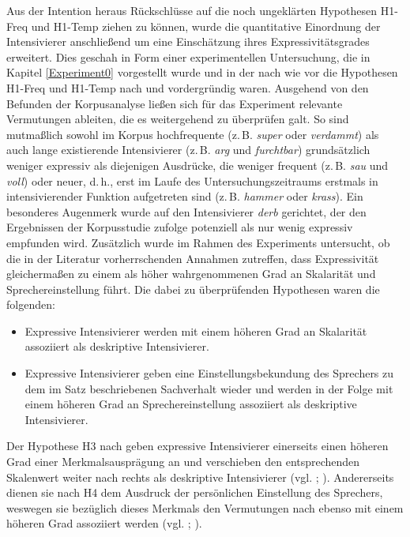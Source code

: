 Aus der Intention heraus Rückschlüsse auf die noch ungeklärten Hypothesen H1-Freq und H1-Temp ziehen zu können, wurde die quantitative Einordnung der Intensivierer anschließend um eine Einschätzung ihres Expressivitätsgrades erweitert. Dies geschah in Form einer experimentellen Untersuchung, die in Kapitel \ref{Experiment0} vorgestellt wurde und in der nach wie vor die Hypothesen H1-Freq und H1-Temp nach \citet[2]{Hauschild.1899} und \citet[59]{Tobler.1868} vordergründig waren. Ausgehend von den Befunden der Korpusanalyse ließen sich für das Experiment relevante Vermutungen ableiten, die es weitergehend zu überprüfen galt. So sind mutmaßlich sowohl im Korpus hochfrequente (z.\,B. \textit{super} oder \textit{verdammt}) als auch lange existierende Intensivierer (z.\,B. \textit{arg} und \textit{furchtbar}) grundsätzlich weniger expressiv als diejenigen Ausdrücke, die weniger frequent (z.\,B. \textit{sau} und \textit{voll}) oder neuer, d.\,h., erst im Laufe des Untersuchungszeitraums erstmals in intensivierender Funktion aufgetreten sind (z.\,B. \textit{hammer} oder \textit{krass}). Ein besonderes Augenmerk wurde auf den Intensivierer \textit{derb} gerichtet, der den Ergebnissen der Korpusstudie zufolge potenziell als nur wenig expressiv empfunden wird. Zusätzlich wurde im Rahmen des Experiments untersucht, ob die in der Literatur vorherrschenden Annahmen zutreffen, dass Expressivität gleichermaßen zu einem als höher wahrgenommenen Grad an Skalarität und Sprechereinstellung führt. Die dabei zu überprüfenden Hypothesen waren die folgenden:

\begin{itemize}
\item[\textbf{\textsc{H3}}] Expressive Intensivierer werden mit einem höheren Grad an Skalarität
assoziiert als deskriptive Intensivierer. 

\item[\textbf{\textsc{H4}}] Expressive Intensivierer geben eine Einstellungsbekundung des Sprechers
zu dem im Satz beschriebenen Sachverhalt wieder und werden in der Folge mit einem höheren Grad an Sprechereinstellung assoziiert als deskriptive Intensivierer. 
\end{itemize}

\noindent Der Hypothese H3 nach geben expressive Intensivierer einerseits einen höheren Grad einer Merkmalsausprägung an und verschieben den entsprechenden Skalenwert weiter nach rechts als deskriptive Intensivierer (vgl. \citealt[22]{Paradis.1997}; \citealt[133]{Gutzmann.2019a}). Andererseits dienen sie nach H4 dem Ausdruck der persönlichen Einstellung des Sprechers, weswegen sie bezüglich dieses Merkmals den Vermutungen nach ebenso mit einem höheren Grad assoziiert werden (vgl. \citealt[315]{Lang.1983}; \citealt[57]{Ortner.2014}).


